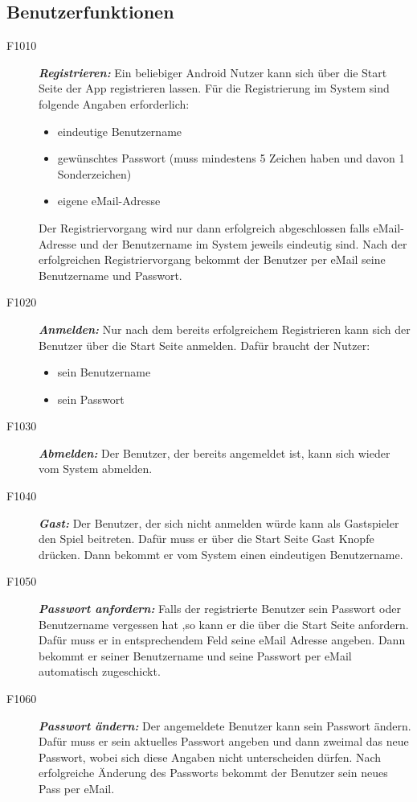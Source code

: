 \documentclass[parskip=full]{scrartcl}
\begin{document}
\subsection{Benutzerfunktionen}
\begin{description}
	\item[F1010] \textbf{\textit{Registrieren: }} Ein beliebiger Android Nutzer kann sich über die Start Seite der App registrieren lassen. Für die Registrierung im System sind folgende Angaben erforderlich: 
	\begin{itemize}
		\item eindeutige Benutzername
		\item gewünschtes Passwort (muss mindestens 5 Zeichen haben und davon 1 Sonderzeichen)
		\item eigene eMail-Adresse
	\end{itemize}
	Der Registriervorgang wird nur dann erfolgreich abgeschlossen falls eMail-Adresse und der Benutzername im System jeweils eindeutig sind. Nach der erfolgreichen Registriervorgang bekommt der Benutzer per eMail seine Benutzername und Passwort.
	\item[F1020] \textbf{\textit{Anmelden: }} Nur nach dem bereits erfolgreichem Registrieren kann sich der Benutzer über die Start Seite anmelden. Dafür braucht der Nutzer:
	\begin{itemize}
		\item sein Benutzername
		\item sein Passwort
	\end{itemize}  
	\item[F1030] \textbf{\textit{Abmelden: }} Der Benutzer, der bereits angemeldet ist, kann sich wieder vom System abmelden.
	\item[F1040] \textbf{\textit{Gast: }} Der Benutzer, der sich nicht anmelden würde kann als Gastspieler den Spiel beitreten. Dafür muss er über die Start Seite Gast Knopfe drücken. Dann bekommt er vom System einen eindeutigen Benutzername. %
	\item[F1050] \textbf{\textit{Passwort anfordern: }} Falls der registrierte Benutzer sein Passwort oder Benutzername vergessen hat ,so kann er die über die Start Seite anfordern. Dafür muss er in entsprechendem Feld seine eMail Adresse angeben. Dann bekommt er seiner Benutzername und seine Passwort per eMail automatisch zugeschickt.
	\item[F1060] \textbf{\textit{Passwort ändern: }}
	Der angemeldete Benutzer kann sein Passwort ändern. Dafür muss er sein aktuelles Passwort angeben und dann zweimal das neue Passwort, wobei sich diese Angaben nicht unterscheiden dürfen. Nach erfolgreiche Änderung des Passworts bekommt der Benutzer sein neues Pass per eMail.
	
	
\end{description}
\end{document}
